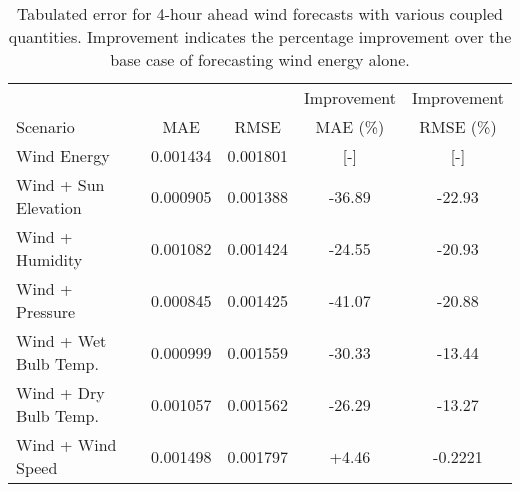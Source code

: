   \begin{table*}[t]
    \centering
    \caption{Tabulated error for 4-hour ahead wind forecasts with various coupled quantities. Improvement indicates the percentage improvement over the base case of forecasting wind energy alone.}
    \label{tab:wind04}
    \begin{tabular}{l|c|c|c|c}
      &  & & Improvement & Improvement \\
      Scenario  & MAE & RMSE & MAE (\%) & RMSE (\%)\\
      \hline
      Wind Energy & 0.001434 & 0.001801 & [-] & [-] \\
      Wind + Sun Elevation & 0.000905 & 0.001388 & -36.89& -22.93\\
      Wind + Humidity & 0.001082 & 0.001424 & -24.55& -20.93\\
      Wind + Pressure & 0.000845 & 0.001425 & -41.07& -20.88\\
      Wind + Wet Bulb Temp. & 0.000999 & 0.001559 & -30.33& -13.44\\
      Wind + Dry Bulb Temp. & 0.001057 & 0.001562 & -26.29& -13.27\\
      Wind + Wind Speed & 0.001498 & 0.001797 & +4.46 & -0.2221\\
    \end{tabular}
  \end{table*}
